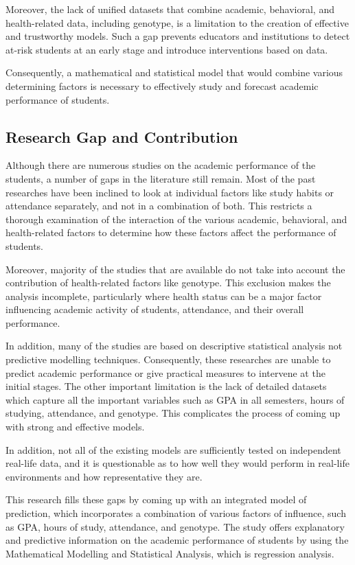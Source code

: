 \documentclass[12pt]{report}
\begin{document}
	Moreover, the lack of unified datasets that combine academic, behavioral, and health-related data, including genotype, is a limitation to the creation of effective and trustworthy models. Such a gap prevents educators and institutions to detect at-risk students at an early stage and introduce interventions based on data.
	
	Consequently, a mathematical and statistical model that would combine various determining factors is necessary to effectively study and forecast academic performance of students.
	
	\subsection{Research Gap and Contribution}
	Although there are numerous studies on the academic performance of the students, a number of gaps in the literature still remain. Most of the past researches have been inclined to look at individual factors like study habits or attendance separately, and not in a combination of both. This restricts a thorough examination of the interaction of the various academic, behavioral, and health-related factors to determine how these factors affect the performance of students.
	
	Moreover, majority of the studies that are available do not take into account the contribution of health-related factors like genotype. This exclusion makes the analysis incomplete, particularly where health status can be a major factor influencing academic activity of students, attendance, and their overall performance.
	
	In addition, many of the studies are based on descriptive statistical analysis not predictive modelling techniques. Consequently, these researches are unable to predict academic performance or give practical measures to intervene at the initial stages. The other important limitation is the lack of detailed datasets which capture all the important variables such as GPA in all semesters, hours of studying, attendance, and genotype. This complicates the process of coming up with strong and effective models.
	
	In addition, not all of the existing models are sufficiently tested on independent real-life data, and it is questionable as to how well they would perform in real-life environments and how representative they are.
	
	This research fills these gaps by coming up with an integrated model of prediction, which incorporates a combination of various factors of influence, such as GPA, hours of study, attendance, and genotype. The study offers explanatory and predictive information on the academic performance of students by using the Mathematical Modelling and Statistical Analysis, which is regression analysis.
	
\end{document}

